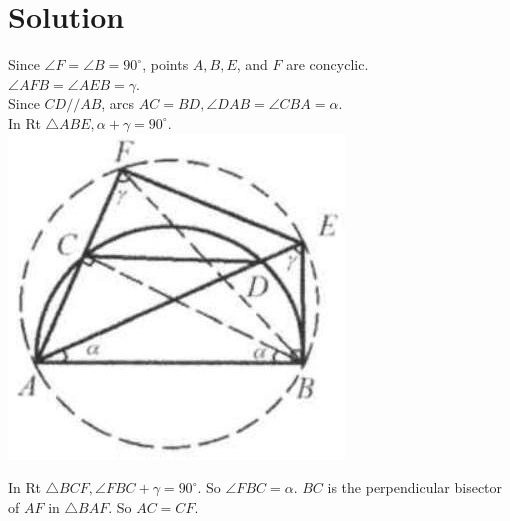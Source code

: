 \documentclass{article}
\begin{document}
\section*{Solution}
Since \(\angle F=\angle B=90^{\circ}\), points \(A, B, E\), and \(F\) are concyclic.\\
\(\angle A F B=\angle A E B=\gamma\).\\
Since \(C D / / A B\), arcs \(A C=B D, \angle D A B=\angle C B A=\alpha\).\\
In Rt \(\triangle A B E, \alpha+\gamma=90^{\circ}\).\\
\centering
\includegraphics[width=\textwidth]{images/209.jpg}

In Rt \(\triangle B C F, \angle F B C+\gamma=90^{\circ}\). So \(\angle F B C=\alpha\). \(B C\) is the perpendicular bisector of \(A F\) in \(\triangle B A F\). So \(A C=C F\).
\end{document}
